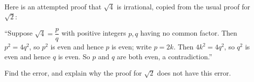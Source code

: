 Here is an attempted proof that $\sqrt4$ is irrational, copied from the usual proof for $\sqrt2$:

``Suppose $\sqrt4=\dfrac {p}{q}$ with positive integers $p,q$ having no common factor. Then $p^2=4q^2$, so $p^2$ is even and hence $p$ is even; write $p=2k$. Then $4k^2=4q^2$, so $q^2$ is even and hence $q$ is even. So $p$ and $q$ are both even, a contradiction.''

Find the error, and explain why the proof for $\sqrt2$ does not have this error.
